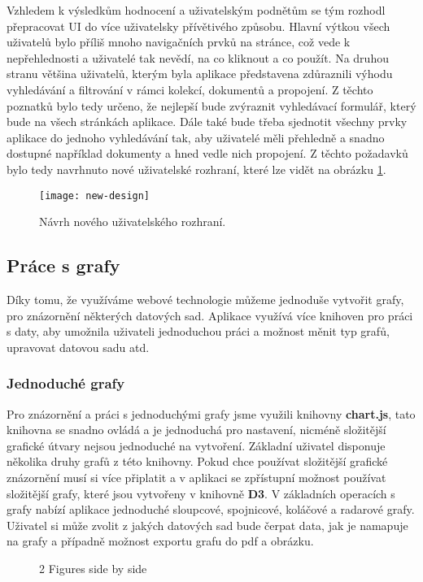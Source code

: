 \par Vzhledem k výsledkům hodnocení a uživatelským podnětům se tým rozhodl přepracovat UI do více uživatelsky přívětivého způsobu. Hlavní výtkou všech uživatelů bylo příliš mnoho navigačních prvků na stránce, což vede k nepřehlednosti a uživatelé tak nevědí, na co kliknout a co použít. Na druhou stranu většina uživatelů, kterým byla aplikace představena zdůraznili výhodu vyhledávání a filtrování v rámci kolekcí, dokumentů a propojení. Z těchto poznatků bylo tedy určeno, že nejlepší bude zvýraznit vyhledávací formulář, který bude na všech stránkách aplikace. Dále také bude třeba sjednotit všechny prvky aplikace do jednoho vyhledávání tak, aby uživatelé měli přehledně a snadno dostupné například dokumenty a hned vedle nich propojení. Z těchto požadavků bylo tedy navrhnuto nové uživatelské rozhraní, které lze vidět na obrázku \ref{new-ui}.

\begin{figure}[htp]
\centering
\texttt{[image: new-design]}
\caption{Návrh nového uživatelského rozhraní.}
\label{new-ui}
\end{figure}

\subsection{Práce s grafy}
\par Díky tomu, že využíváme webové technologie můžeme jednoduše vytvořit grafy, pro znázornění některých datových sad. Aplikace využívá více knihoven pro práci s daty, aby umožnila uživateli jednoduchou práci a možnost měnit typ grafů, upravovat datovou sadu atd.

\subsubsection{Jednoduché grafy}
\par Pro znázornění a práci s jednoduchými grafy jsme využili knihovny \textbf{chart.js}, tato knihovna se snadno ovládá a je jednoduchá pro nastavení, nicméně složitější grafické útvary nejsou jednoduché na vytvoření. Základní uživatel disponuje několika druhy grafů z této knihovny. Pokud chce používat složitější grafické znázornění musí si více připlatit a v aplikaci se zpřístupní možnost používat složitější grafy, které jsou vytvořeny v knihovně \textbf{D3}. V základních operacích s grafy nabízí aplikace jednoduché sloupcové, spojnicové, koláčové a radarové grafy. Uživatel si může zvolit z jakých datových sad bude čerpat data, jak je namapuje na grafy a případně možnost exportu grafu do pdf a obrázku.
\begin{figure}[!htb]
\centering
{}%
%
%
\caption{2 Figures side by side}%
\label{fig:example}%
\end{figure}

